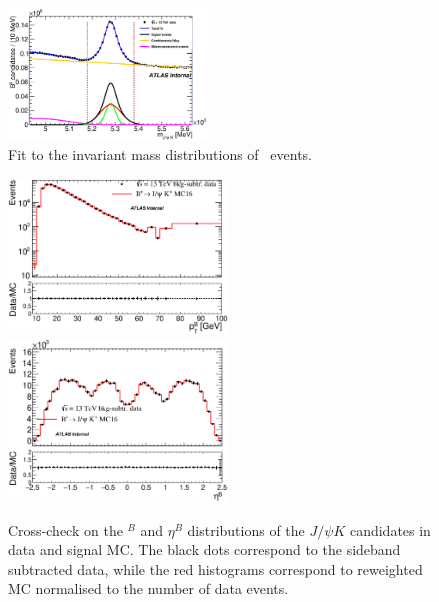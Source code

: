 \begin{figure}[!ht]
\begin{center}
\hspace*{-0.6cm}
\includegraphics[width=0.47\textwidth]{figures/InternalNote_DataMCComparison/Bp/bplusbinnedfit.eps}
\caption{
Fit to the invariant mass distributions of \BpKpJpsi\ events.}
\label{fig:bplusbinned}
\end{center}
\end{figure}
%
\begin{figure}[!htb]
\begin{center}
\hspace*{-0.6cm}
\includegraphics[width=0.52\textwidth]{figures/InternalNote_DataMCComparison/Bp/bplus_pT.eps}
\hspace*{-0.6cm}
\includegraphics[width=0.52\textwidth]{figures/InternalNote_DataMCComparison/Bp/bplus_eta.eps}
\caption{Cross-check on the \pt$^B$ and $\eta^B$ distributions of
the $J/\psi K$ candidates in data and signal MC.
The black dots correspond to the sideband subtracted data, while 
the red histograms correspond to reweighted MC 
normalised to the number of data events.}
\label{fig:xcheckcompBp}
\end{center}
\end{figure}
